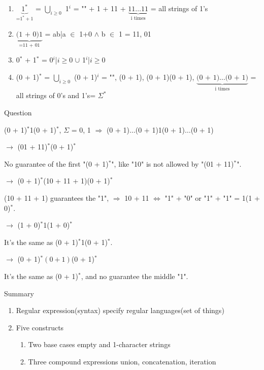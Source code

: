 \documentclass[11pt]{report}
\newcommand{\cmark}{\ding{51}}%
\newcommand{\xmark}{\ding{55}}%
\newenvironment{cell}{%
	\tcolorbox[blanker,breakable,left=5mm,
	before skip=10pt,after skip=10pt,
	borderline west={1mm}{0pt}{stanfordred}]
}%
{\endtcolorbox}
\begin{document}
\begin{enumerate}
    \item $\underbrace{\text{1}^*}_{\text{=1}^* + \text{1}}$ = $\displaystyle\bigcup_{i\geq0}$ 1$^i$ = "" + 1 + 11 + $\underbrace{\text{11} \dots \text{11}}_{\text{i times}}$ = all strings of 1's
    \item $\underbrace{\text{(1 + 0)}1}_{\text{=11 + 01}}$ = {ab|a $\in$ 1+0 $\wedge$ b $\in$ 1} = {11, 01}
    \item 0$^*$ + 1$^*$ = {0$^i$|$i\geq0$} $\cup$ {1$^i$|$i\geq0$}
    \item (0 + 1)$^*$ = $\displaystyle\bigcup_{i\geq0}$ (0 + 1)$^i$ = "", (0 + 1), (0 + 1)(0 + 1), $\underbrace{\text{(0 + 1)} \dots \text{(0 + 1)}}_{\text{i times}}$ \newline = all strings of 0's and 1's\newline = $\Sigma^*$
\end{enumerate}
\textcolor{stanfordred}{Question}\vspace{\baselineskip}

(0 + 1)$^*$1(0 + 1)$^*$, $\Sigma$ = {0, 1} $\Rightarrow$ (0 + 1)$\dots$(0 + 1)1(0 + 1)$\dots$(0 + 1)\vspace{\baselineskip}

$\rightarrow$ (01 + 11)$^*$(0 + 1)$^*\quad$\xmark

No guarantee of the first "(0 + 1)$^*$", like "10" is not allowed by "(01 + 11)$^*$".\vspace{\baselineskip}

$\rightarrow$ (0 + 1)$^*$(10 + 11 + 1)(0 + 1)$^*\quad$\cmark 

(10 + 11 + 1) guarantees the "1", $\Rightarrow$ 10 + 11 $\Leftrightarrow$ "1" + "0" or "1" + "1" = 1(1 + 0)$^*$.\vspace{\baselineskip}

$\rightarrow$ (1 + 0)$^*$1(1 + 0)$^*\quad$\cmark 

It's the same as (0 + 1)$^*$1(0 + 1)$^*$.\vspace{\baselineskip}

$\rightarrow$ (0 + 1)$^*(0 + 1)$(0 + 1)$^*\quad$\xmark

It's the same as (0 + 1)$^*$, and no guarantee the middle "1".\vspace{\baselineskip}

\begin{cell}
    \textcolor{stanfordred}{Summary}
    \begin{enumerate}
        \item \textcolor{stanfordred}{Regular expression}(syntax) specify \textcolor{stanfordred}{regular languages}(set of things)
        \item Five constructs
        \begin{enumerate}
            \item Two base cases
                empty and 1-character strings
            \item Three compound expressions
                union, concatenation, iteration
        \end{enumerate}
    \end{enumerate}
\end{cell}
 
\end{document}
